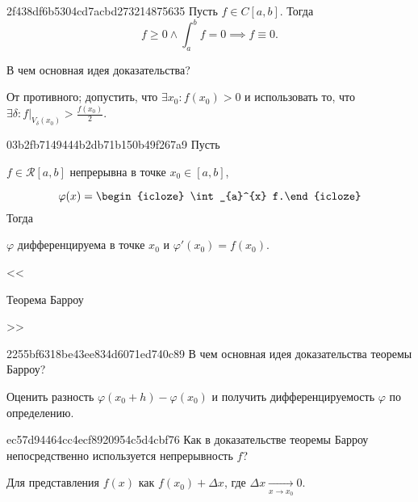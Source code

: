 \begin{note}{2f438df6b5304cd7acbd273214875635}
    Пусть \({ f \in C[a, b] }\).
    Тогда
    \[
        f \geqslant 0 \land \int_{a}^{b} f = 0 \implies f \equiv 0.
    \]

    В чем основная идея доказательства?

    \begin{cloze}{1}
        От противного; допустить, что \({ \exists x_0 : f(x_0) > 0 }\) и использовать то, что \({ \exists \delta : f|_{V_{\delta}(x_0)} > \frac{f(x_0)}{2} }\).
    \end{cloze}
\end{note}

\begin{note}{03b2fb7149444b2db71b150b49f267a9}
    Пусть \begin{icloze}{3}\({ f \in \mathcal R[a, b] }\) непрерывна в точке \({ x_0 \in [a, b] }\),\end{icloze}
    \[
        \varphi(x) = \begin{icloze}{2}\int_{a}^{x} f.\end{icloze}
    \]
    Тогда \begin{icloze}{1}\({ \varphi }\) дифференцируема в точке \({ x_0 }\) и \({ \varphi'(x_0) = f(x_0) }\).\end{icloze}

    \begin{center}
        \tiny
        <<\begin{icloze}{4}Теорема Барроу\end{icloze}>>
    \end{center}
\end{note}

\begin{note}{2255bf6318be43ee834d6071ed740c89}
    В чем основная идея доказательства теоремы Барроу?

    \begin{cloze}{1}
        Оценить разность \({ \varphi(x_0 + h) - \varphi(x_0) }\) и получить дифференцируемость \({ \varphi }\) по определению.
    \end{cloze}
\end{note}

\begin{note}{ec57d94464cc4ecf8920954c5d4cbf76}
    Как в доказательстве теоремы Барроу непосредственно используется непрерывность \({ f }\)?

    \begin{cloze}{1}
        Для представления \({ f(x) }\) как \({ f(x_0) + \Delta x }\), где \({ \Delta x \underset{x \to x_0}\longrightarrow 0 }\).
    \end{cloze}
\end{note}

